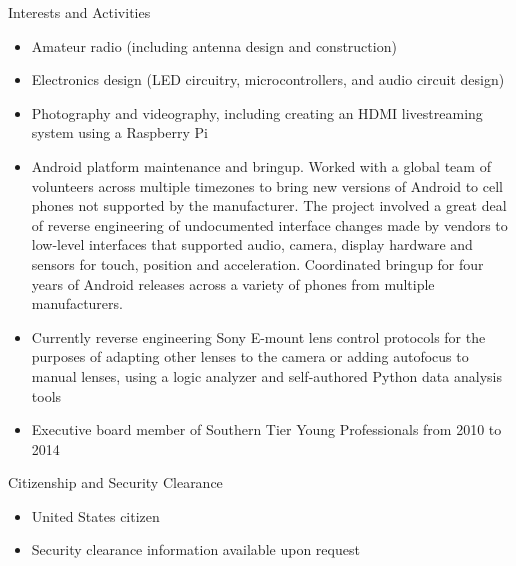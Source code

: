 \documentclass[10pt,oneside]{article}
\newenvironment{ressection}[1]{
	\vspace{4pt}
	{\Large#1}
	\begin{itemize}
	\vspace{3pt}
}{
	\end{itemize}
}
\newcommand{\resitem}[1]{
	\vspace{-4pt}
	\item \begin{flushleft} #1 \end{flushleft}
}
\newenvironment{ressection}[1]{
	\vspace{4pt}
	{\fontfamily{phv}\selectfont\Large#1}
	\begin{itemize}[leftmargin=12pt]
	\vspace{3pt}
}{
	\end{itemize}
}
\newcommand{\resitem}[1]{
	\vspace{-4pt}
	\item \begin{flushleft} #1 \end{flushleft}
}
\begin{document}
\begin{ressection}{Interests and Activities}
		\resitem{Amateur radio (including antenna design and construction)}
		\resitem{Electronics design (LED circuitry, microcontrollers, and audio circuit design)}
		\resitem{Photography and videography, including creating an HDMI livestreaming system using a Raspberry Pi}
	        \resitem{Android platform maintenance and bringup.  Worked with a global team of volunteers across multiple timezones to bring new versions of Android to cell phones not supported by the manufacturer.  The project involved a great deal of reverse engineering of undocumented interface changes made by vendors to low-level interfaces that supported audio, camera, display hardware and sensors for touch, position and acceleration.  Coordinated bringup for four years of Android releases across a variety of phones from multiple manufacturers.}
                \resitem{Currently reverse engineering Sony E-mount lens control protocols for the purposes of adapting other lenses to the camera or adding autofocus to manual lenses, using a logic analyzer and self-authored Python data analysis tools}
		\resitem{Executive board member of Southern Tier Young Professionals from 2010 to 2014}
\end{ressection}

\begin{ressection}{Citizenship and Security Clearance}

	\resitem{United States citizen}

	\resitem{Security clearance information available upon request}

\end{ressection}
\end{document}
